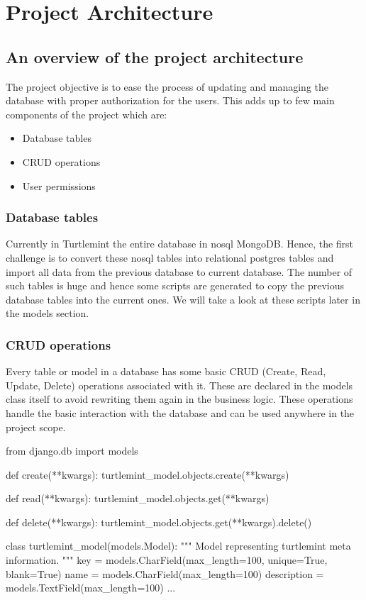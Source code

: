 \chapter{Project Architecture}

\section{An overview of the project architecture}
The project objective is to ease the process of updating and managing the
database with proper authorization for the users. This adds up to few main
components of the project which are:

\begin{itemize}
    \item Database tables
    \item CRUD operations
    \item User permissions
\end{itemize}

\subsection{Database tables}
Currently in Turtlemint the entire database in nosql MongoDB. Hence, the first
challenge is to convert these nosql tables into relational postgres tables and
import all data from the previous database to current database. The number of
such tables is huge and hence some scripts are generated to copy the previous
database tables into the current ones. We will take a look at these scripts
later in the models section.

\subsection{CRUD operations}
Every table or model in a database has some basic CRUD (Create, Read, Update,
Delete) operations associated with it. These are declared in the models class
itself to avoid rewriting them again in the business logic. These operations
handle the basic interaction with the database and can be used anywhere in the
project scope.

\begin{pythoncode}
from django.db import models

def create(**kwargs):
    turtlemint_model.objects.create(**kwargs)

def read(**kwargs):
    turtlemint_model.objects.get(**kwargs)

def delete(**kwargs):
    turtlemint_model.objects.get(**kwargs).delete()

class turtlemint_model(models.Model):
    """
    Model representing turtlemint meta information.
    """
    key = models.CharField(max_length=100, unique=True, blank=True)
    name = models.CharField(max_length=100)
    description = models.TextField(max_length=100)
    ...
\end{pythoncode}

